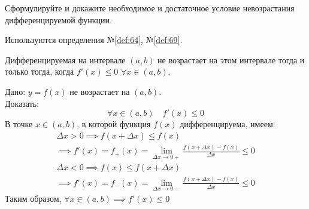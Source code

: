 \begin{question}
    Сформулируйте и докажите необходимое и достаточное условие невозрастания дифференцируемой функции.
\end{question}
\begin{used}
    Используются определения №\ref{def:64}, №\ref{def:69}.
\end{used}
\begin{theorem}
    Дифференцируемая на интервале $(a, b)$ не возрастает на этом интервале тогда и только тогда, когда  $f'(x) \le 0$ $\forall x \in (a, b)$.
\end{theorem}
\begin{necessity}
    Дано: $y=f(x)$ не возрастает на $(a, b)$. \\
    Доказать:  \[ 
        \forall x \in (a, b) \quad f'(x) \le 0
    \] 
    В точке $x \in (a, b)$, в которой функция $f(x)$ дифференцируема, имеем:
    \begin{gather*}
        \Delta x > 0 \implies f(x + \Delta x) \le f(x) \\
        \implies f'(x) = f_+(x) = \lim_{\Delta x \to 0+} \frac{f(x + \Delta x) - f(x)}{\Delta x} \le 0
    \end{gather*} 
    \begin{gather*}
        \Delta x < 0 \implies f(x) \le f(x + \Delta x) \\
        \implies f'(x) = f_-(x) = \lim_{\Delta x \to 0-} \frac{f(x + \Delta x) - f(x)}{\Delta x} \le 0
    \end{gather*}
    Таким образом, $\forall x \in (a, b) \implies f'(x) \le 0$ 
\end{necessity}
